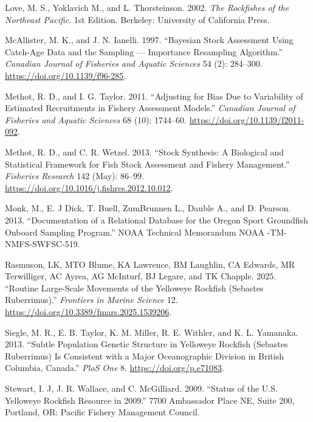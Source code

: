\documentclass[
]{scrartcl}
\newlength{\cslhangindent}
\newenvironment{CSLReferences}[2] %
 {\begin{list}{}{%
  \setlength{\itemindent}{0pt}
  \setlength{\leftmargin}{0pt}
  \setlength{\parsep}{0pt}
  \ifodd #1
   \setlength{\leftmargin}{\cslhangindent}
   \setlength{\itemindent}{-1\cslhangindent}
  \fi
  \setlength{\itemsep}{#2\baselineskip}}}
 {\end{list}}
\begin{document}
\begin{CSLReferences}{1}{0}
Love, M. S., Yoklavich M., and L. Thorsteinson. 2002. \emph{The
{Rockfishes} of the {Northeast} {Pacific}}. 1st Edition. Berkeley:
University of California Press.

McAllister, M. K., and J. N. Ianelli. 1997. {``Bayesian Stock Assessment
Using Catch-Age Data and the Sampling --- Importance Resampling
Algorithm.''} \emph{Canadian Journal of Fisheries and Aquatic Sciences}
54 (2): 284--300. \url{https://doi.org/10.1139/f96-285}.

Methot, R. D., and I. G. Taylor. 2011. {``Adjusting for Bias Due to
Variability of Estimated Recruitments in Fishery Assessment Models.''}
\emph{Canadian Journal of Fisheries and Aquatic Sciences} 68 (10):
1744--60. \url{https://doi.org/10.1139/f2011-092}.

Methot, R. D., and C. R. Wetzel. 2013. {``Stock Synthesis: A Biological
and Statistical Framework for Fish Stock Assessment and Fishery
Management.''} \emph{Fisheries Research} 142 (May): 86--99.
\url{https://doi.org/10.1016/j.fishres.2012.10.012}.

Monk, M., E. J Dick, T. Buell, ZumBrunnen L., Dauble A., and D. Pearson.
2013. {``Documentation of a Relational Database for the Oregon Sport
Groundfish Onboard Sampling Program.''} NOAA Technical Memorandum NOAA
-TM-NMFS-SWFSC-519.

Rasmuson, LK, MTO Blume, KA Lawrence, BM Laughlin, CA Edwards, MR
Terwilliger, AC Ayrea, AG McInturf, BJ Legare, and TK Chapple. 2025.
{``Routine Large-Scale Movements of the Yelloweye Rockfish (Sebastes
Ruberrimus).''} \emph{Frontiers in Marine Science} 12.
\url{https://doi.org/10.3389/fmars.2025.1539206}.

Siegle, M. R., E. B. Taylor, K. M. Miller, R. E. Withler, and K. L.
Yamanaka. 2013. {``Subtle Population Genetic Structure in Yelloweye
Rockfish (Sebastes Ruberrimus) Is Consistent with a Major Oceanographic
Division in British Columbia, Canada.''} \emph{PloS One} 8.
\url{https://doi.org/p.e71083}.

Stewart, I. J, J. R. Wallace, and C. McGilliard. 2009. {``Status of the
{U}.{S}. Yelloweye Rockfish Resource in 2009.''} 7700 Ambassador Place
NE, Suite 200, Portland, OR: Pacific Fishery Management Council.


\end{CSLReferences}
\end{document}
